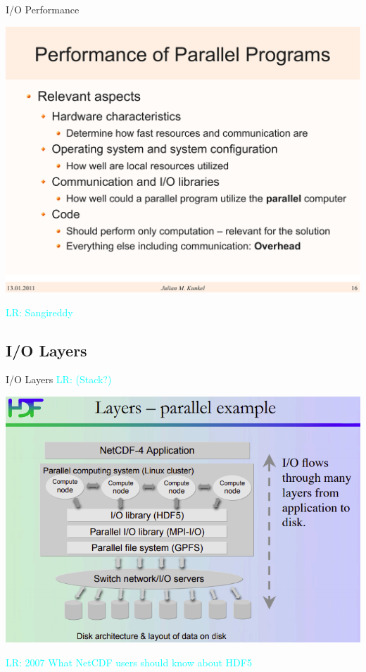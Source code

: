 \documentclass[compress,11pt,xcolor=svgnames,aspectratio=169]{beamer}
\newcommand{\lr}[1]{\textcolor{cyan}{LR: #1}}
\begin{document}
\begin{frame}[t]{I/O Performance}

\begin{center}
\includegraphics[scale=0.4]{fig/performance}
\end{center}

\lr{Sangireddy}

\end{frame}

\subsection{I/O Layers}

\begin{frame}[t]{I/O Layers \lr{(Stack?)}}

\begin{center}
\includegraphics[scale=0.5]{fig/io-layers}
\end{center}

\lr{2007 What NetCDF users should know about HDF5}

\end{frame}
\end{document}
